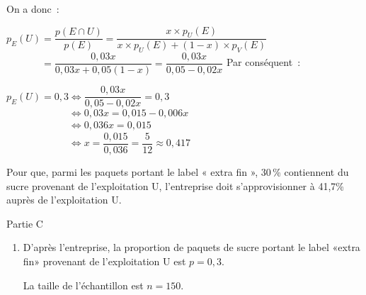 \begin{corrige}
\begin{enumerate}
\begin{center}
\begin{extern}
               \end{extern}
          \end{center}
          \par
          On a donc~:
          \par
          $p_E(U)=\dfrac{p(E\cap U)}{p(E)} = \dfrac{x\times p_U(E)}{x\times p_U(E) +(1-x)\times p_V(E)}$\\
          $\phantom{p_E(U)}=\dfrac{0,03x}{0,03x +0,05(1-x)}=\dfrac{0,03x}{0,05 -0,02x}$
          \medskip
          Par conséquent~:
          \par
          $p_E(U)=0,3 \Leftrightarrow \dfrac{0,03x}{0,05 -0,02x}=0,3$\\
          $\phantom{p_E(U)=0,3} \Leftrightarrow 0,03x=0,015-0,006x$\\
          $\phantom{p_E(U)=0,3} \Leftrightarrow 0,036x=0,015$\\
          $\phantom{p_E(U)=0,3} \Leftrightarrow  x=\dfrac{0,015}{0,036}=\dfrac{5}{12}\approx 0,417 $
          \par
          Pour que, parmi les paquets portant le label « extra fin », 30\,\%  contiennent du sucre provenant de l'exploitation U, l'entreprise doit s'approvisionner à  41,7\% auprès de l'exploitation U.
     \end{enumerate}
     \begin{center}\begin{h3}Partie C \end{h3}\end{center}
     \begin{enumerate}
          \item
          D'après l'entreprise, la proportion de paquets de sucre portant le label «extra fin» provenant de l’exploitation U est $p = 0,3$.
          \par
          La taille  de l'échantillon est $n=150$.

\end{enumerate}
\end{corrige}
